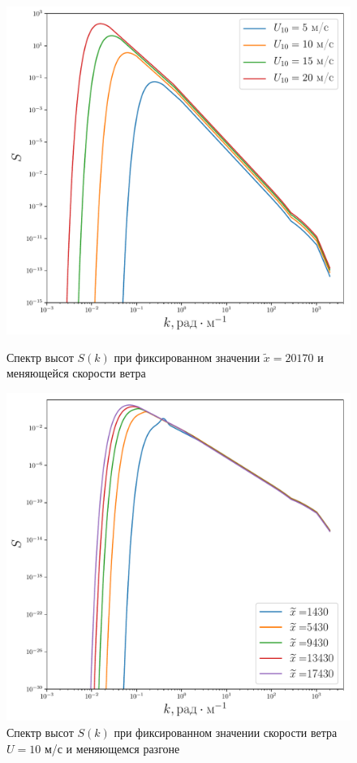 \begin{figure}[h!]
	\begin{minipage}{0.49\linewidth}
			\centering
			\includegraphics[width=\linewidth]{fig/full_spectrum1.pdf}
			\caption{Спектр высот $S(k)$ при фиксированном значении $\tilde x=20170$ и меняющейся скорости ветра}		
			\label{fig:full_spectrum1}
	\end{minipage}
	\hfill
	\begin{minipage}{0.49\linewidth}
			\centering
			\includegraphics[width=\linewidth]{fig/full_spectrum2.pdf}
			\caption{Спектр высот $S(k)$ при фиксированном значении скорости ветра 
			$U=10$ м/с и меняющемся разгоне}		
			\label{fig:full_spectrum2}
	\end{minipage}
\end{figure}


